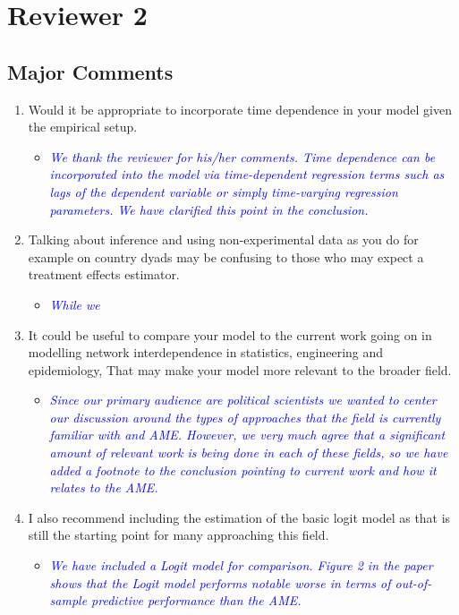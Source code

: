 \section{Reviewer 2}

\subsection{Major Comments}

\begin{enumerate}
	\item Would it be appropriate to incorporate time dependence in your model given the empirical setup.
	\begin{itemize}
		\item \textcolor{blue}{ \emph{
		We thank the reviewer for his/her comments. Time dependence can be incorporated into the model via time-dependent regression terms such as lags of the dependent variable or simply time-varying regression parameters. We have clarified this point in the conclusion.
		}}
	\end{itemize}
	\item Talking about inference and using non-experimental data as you do for example on country dyads may be confusing to those who may expect a treatment effects estimator.
	\begin{itemize}
		\item \textcolor{blue}{ \emph{
		While we 
		}}
	\end{itemize}	
	\item It could be useful to compare your model to the current work going on in modelling network interdependence in statistics, engineering and epidemiology, That may make your model more relevant to the broader field.
	\begin{itemize}
		\item \textcolor{blue}{ \emph{
		Since our primary audience are political scientists we wanted to center our discussion around the types of approaches that the field is currently familiar with and AME. However, we very much agree that a significant amount of relevant work is being done in each of these fields, so we have added a footnote to the conclusion pointing to current work and how it relates to the AME.
		}}
	\end{itemize}	
	\item I also recommend including the estimation of the basic logit model as that is still the starting point for many approaching this field.
	\begin{itemize}
		\item \textcolor{blue}{ \emph{
		We have included a Logit model for comparison. Figure 2 in the paper shows that the Logit model performs notable worse in terms of out-of-sample predictive performance than the AME.
		}}
	\end{itemize}	
\end{enumerate}